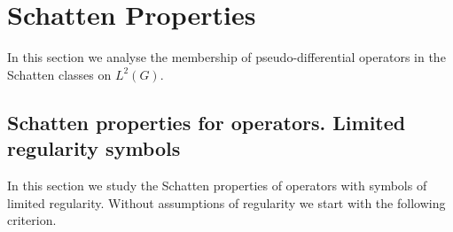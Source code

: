 \documentclass[12pt, reqno]{amsart}
\theoremstyle{definition}
\theoremstyle{remark}
\numberwithin{equation}{section}
\begin{document}
\section{Schatten Properties}\label{Schatten:Properties}
In this section we analyse the membership of pseudo-differential operators in the Schatten classes on $L^2(G).$ 


\subsection{Schatten properties for operators. Limited regularity symbols}\label{limited:regularity:section}
In this section we stu\textnormal{d}y the Schatten properties of operators with symbols of limited regularity. 
Without assumptions of regularity we start with the following criterion.
\end{document}
